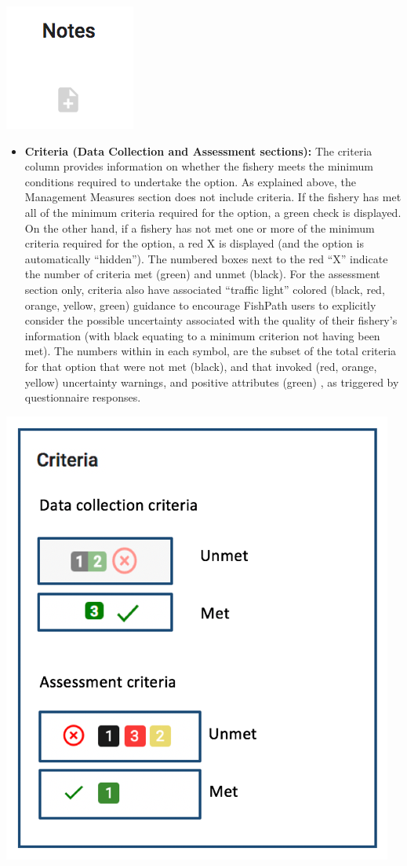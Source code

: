 \documentclass[11pt,]{book}
\providecommand{\tightlist}{%
  \setlength{\itemsep}{0pt}\setlength{\parskip}{0pt}}
\begin{document}
\begin{center}\includegraphics[width=0.15\linewidth]{images/notes} \end{center}

\begin{itemize}
\tightlist
\item
  \textbf{Criteria (Data Collection and Assessment sections):} The
  criteria column provides information on whether the fishery meets the
  minimum conditions required to undertake the option. As explained
  above, the Management Measures section does not include criteria. If
  the fishery has met all of the minimum criteria required for the
  option, a green check is displayed. On the other hand, if a fishery
  has not met one or more of the minimum criteria required for the
  option, a red X is displayed (and the option is automatically
  ``hidden''). The numbered boxes next to the red ``X'' indicate the
  number of criteria met (green) and unmet (black). For the assessment
  section only, criteria also have associated ``traffic light'' colored
  (black, red, orange, yellow, green) guidance to encourage FishPath
  users to explicitly consider the possible uncertainty associated with
  the quality of their fishery's information (with black equating to a
  minimum criterion not having been met). The numbers within in each
  symbol, are the subset of the total criteria for that option that were
  not met (black), and that invoked (red, orange, yellow) uncertainty
  warnings, and positive attributes (green) , as triggered by
  questionnaire responses.
\end{itemize}

\begin{center}\includegraphics[width=0.35\linewidth]{images/criteria} \end{center}
\end{document}
